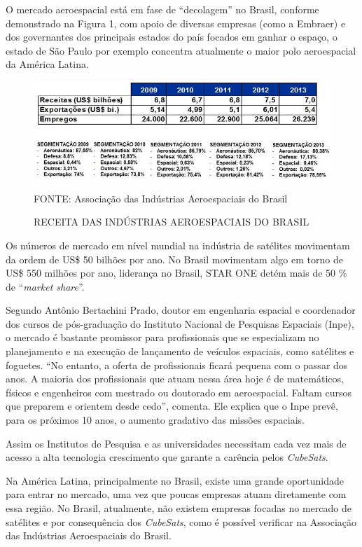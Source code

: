 \documentclass[
	12pt,				%
	openright,			%
	oneside,			%
	a4paper,			%
	english,			%
	french,				%
	spanish,			%
	brazil				%
	]{abntex2}
\begin{document}
	O mercado aeroespacial está em fase de “decolagem” no Brasil, conforme demonstrado na Figura 1, com apoio de diversas empresas (como a Embraer) e dos governantes dos principais estados do país focados em ganhar o espaço, o estado de São Paulo por exemplo concentra atualmente o maior polo aeroespacial da América Latina.

	\begin{figure}[th]
		\caption{RECEITA DAS INDÚSTRIAS AEROESPACIAIS DO BRASIL}
		\centering
		\includegraphics[width=0.8\linewidth]{./figs/Figura_01a}
			
		\begin{small}
			FONTE: Associação das Indústrias Aeroespaciais do Brasil
		\end{small}		
	\end{figure}

	Os números de mercado em nível mundial na indústria de satélites movimentam da ordem de US\$ 50 bilhões por ano. 
No Brasil movimentam algo em torno de US\$ 550 milhões por ano, liderança no Brasil, STAR ONE detém mais de 50 \% de “\textit{market share}”.

	Segundo Antônio Bertachini Prado, doutor em engenharia espacial e coordenador dos cursos de pós-graduação do Instituto Nacional de Pesquisas Espaciais (Inpe), o mercado é bastante promissor para profissionais que se especializam no planejamento e na execução de lançamento de veículos espaciais, como satélites e foguetes. “No entanto, a oferta de profissionais ficará pequena com o passar dos anos. A maioria dos profissionais que atuam nessa área hoje é de matemáticos, físicos e engenheiros com mestrado ou doutorado em aeroespacial. Faltam cursos que preparem e orientem desde cedo”, comenta. Ele explica que o Inpe prevê, para os próximos 10 anos, o aumento gradativo das missões espaciais.
		
	Assim os Institutos de Pesquisa e as universidades necessitam cada vez mais de acesso a alta tecnologia crescimento que garante a carência pelos \textit{CubeSats}.
		
	Na América Latina, principalmente no Brasil, existe uma grande oportunidade para entrar no mercado, uma vez que poucas empresas atuam diretamente com essa região. No Brasil, atualmente, não existem empresas focadas no mercado de satélites e por consequência dos \textit{CubeSats}, como é possível verificar na Associação das Indústrias Aeroespaciais do Brasil.
	
\end{document}
